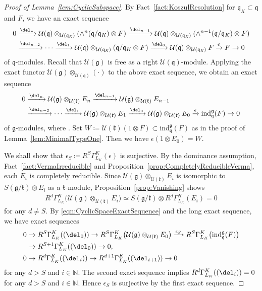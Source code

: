 \documentclass[10pt,a4paper]{amsart}
\numberwithin{equation}{section}
\theoremstyle{definition}
\newcommand{\BasicRing}[1]{\mathbb{#1}}
\newcommand{\NN}{\BasicRing{N}}
\newcommand{\lieC}[1]{\mathfrak{#1}}
\newcommand{\lie}[1]{\mathfrak{#1}}
\newcommand{\univ}[1]{\mathcal{U}(\lieC{#1})}
\newcommand{\ind}[2]{\mathrm{ind}^{\lieC{#1}}_{\lieC{#2}}}
\newcommand{\zuck}[2]{\Gamma^{#1}_{#2}}
\newcommand{\Dzuck}[3]{R^{#3}\zuck{#1}{#2}}
\let\Im\relax
\DeclareMathOperator{\Im}{\mathrm{Im}}
\begin{document}
\begin{proof}[Proof of Lemma~\ref{lem:CyclicSubspace}]
	By Fact~\ref{fact:KoszulResolution} for $\lie{q}_K\subset \lie{q}$ and $F$, we have an exact sequence
	\begin{align*}
0&\xrightarrow{\del_n} \univ{q}\otimes_{\univ{q_\mathit{K}}}(\wedge^n (\lie{q/q_\mathit{K}})\otimes F)
		\xrightarrow{\del_{n-1}} \univ{q}\otimes_{\univ{q_\mathit{K}}}(\wedge^{n-1} (\lie{q/q_\mathit{K}})\otimes F)\\
		& \xrightarrow{\del_{n-2}} \cdots \xrightarrow{\del_{1}} \univ{q}\otimes_{\univ{q_\mathit{K}}}(\lie{q/q_\mathit{K}}\otimes F)
		\xrightarrow{\del_{0}} \univ{q}\otimes_{\univ{q_\mathit{K}}}F
		\xrightarrow{\epsilon} F \rightarrow 0
	\end{align*}
	of $\lie{q}$-modules.
	Recall that $\univ{g}$ is free as a right $\univ{q}$-module.
	Applying the exact functor $\univ{g}\otimes_{\univ{q}}(\cdot)$
	to the above exact sequence, we obtain an exact sequence
	\begin{align}
0&\xrightarrow{\del_n} \univ{g}\otimes_{\univ{k}}E_n
		\xrightarrow{\del_{n-1}} \univ{g}\otimes_{\univ{k}}E_{n-1} \nonumber\\
		& \xrightarrow{\del_{n-2}} \cdots \xrightarrow{\del_{1}} \univ{g}\otimes_{\univ{k}}E_1
		\xrightarrow{\del_{0}} \univ{g}\otimes_{\univ{k}}E_0
		\xrightarrow{\epsilon} \ind{g}{q}(F) \rightarrow 0 \label{eqn:CyclicSpaceExactSequence}
	\end{align}
	of $\lie{g}$-modules, where \smash{$E_i\coloneq\ind{k}{q_\mathit{K}}\bigl(\wedge^i (\lie{q/q_\mathit{K}})\otimes F\bigr)$}.
	Set $W \coloneq \univ{k}(1\otimes F) \subset \ind{g}{q}(F)$ as in the proof of Lemma~\ref{lem:MinimalTypeOne}.
	Then we have $\epsilon(1\otimes E_0)=W$.

	We shall show that $\epsilon_S\coloneq \Dzuck{K}{L_K}{S}(\epsilon)$ is surjective.
	By the dominance assumption, Fact~\ref{fact:VermaIrreducible} and Proposition~\ref{prop:CompletelyReducibleVerma}, each $E_i$ is completely reducible.
	Since $\univ{g}\otimes_{\univ{k}}E_i$
	is isomorphic to $S(\lie{g}/\lie{k})\otimes E_i$ as a $\lie{k}$-module, Proposition~\ref{prop:Vanishing} shows
	\begin{align*}
		\Dzuck{K}{L_K}{d}\bigl(\univ{g}\otimes_{\univ{k}}E_i\bigr)
		\simeq S(\lie{g/k})\otimes \Dzuck{K}{L_K}{d}(E_i) = 0
	\end{align*}
	for any $d \neq S$.
	By \eqref{eqn:CyclicSpaceExactSequence} and the long exact sequence, we have exact sequences
	\begin{align*}
		&0 \rightarrow \Dzuck{K}{L_K}{S}(\Im(\del_0))\rightarrow \Dzuck{K}{L_K}{S}\bigl(\univ{g}\otimes_{\univ{k}}E_0\bigr)
		\xrightarrow{\epsilon_S} \Dzuck{K}{L_K}{S}\bigl(\ind{g}{q}(F)\bigr)\\
		& \hphantom{0} \rightarrow \Dzuck{K}{L_K}{S+1}(\Im(\del_0)) \rightarrow 0, \\
		&0 \rightarrow \Dzuck{K}{L_K}{d}(\Im(\del_{i})) \rightarrow \Dzuck{K}{L_K}{d+1}(\Im(\del_{i+1})) \rightarrow 0
	\end{align*}
	for any $d > S$ and $i \in \NN$.
	The second exact sequence implies $\Dzuck{K}{L_K}{d}(\Im(\del_{i}))=0$ for any $d > S$ and $i \in \NN$.
	Hence $\epsilon_S$ is surjective by the first exact sequence.


\end{proof}
\end{document}
